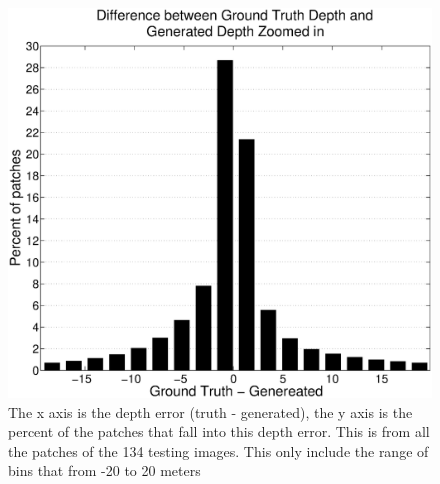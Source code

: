 \documentclass[journal]{IEEEtran}
\begin{document}
\begin{figure}
\label{fig:histogramcut}
\includegraphics[width=\linewidth]{histogramcut.eps}
\caption{The x axis is the depth error (truth - generated), the y axis is the percent of the patches that fall into this depth error. This is from all the patches of the 134 testing images. This only include the range of bins that from -20 to 20 meters}
\end{figure}
\end{document}
